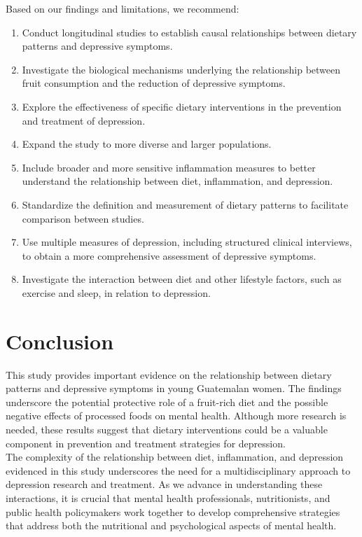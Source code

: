 \documentclass[jou]{apa7}
\begin{document}
	Based on our findings and limitations, we recommend:
	\begin{enumerate}
		\item Conduct longitudinal studies to establish causal relationships between dietary patterns and depressive symptoms.
		\item Investigate the biological mechanisms underlying the relationship between fruit consumption and the reduction of depressive symptoms.
		\item Explore the effectiveness of specific dietary interventions in the prevention and treatment of depression.
		\item Expand the study to more diverse and larger populations.
		\item Include broader and more sensitive inflammation measures to better understand the relationship between diet, inflammation, and depression.
		\item Standardize the definition and measurement of dietary patterns to facilitate comparison between studies.
		\item Use multiple measures of depression, including structured clinical interviews, to obtain a more comprehensive assessment of depressive symptoms.
		\item Investigate the interaction between diet and other lifestyle factors, such as exercise and sleep, in relation to depression.
	\end{enumerate}

	\section{Conclusion}\label{conclusiuxf3n}

	This study provides important evidence on the relationship between dietary patterns and depressive symptoms in young Guatemalan women. The findings underscore the potential protective role of a fruit-rich diet and the possible negative effects of processed foods on mental health. Although more research is needed, these results suggest that dietary interventions could be a valuable component in prevention and treatment strategies for depression.\\

	The complexity of the relationship between diet, inflammation, and depression evidenced in this study underscores the need for a multidisciplinary approach to depression research and treatment. As we advance in understanding these interactions, it is crucial that mental health professionals, nutritionists, and public health policymakers work together to develop comprehensive strategies that address both the nutritional and psychological aspects of mental health.

	\nocite{*}
	\printbibliography

	
\end{document}
